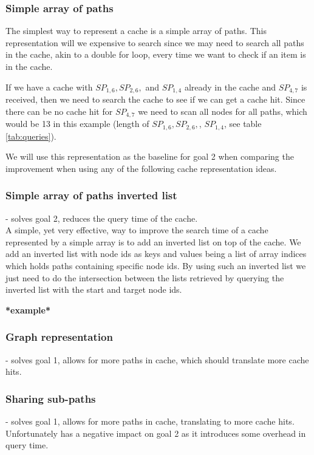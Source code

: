 \subsubsection{Simple array of paths}%
The simplest way to represent a cache is a simple array of paths. This representation will we expensive to search since we may need to search all paths in the cache, akin to a double for loop, every time we want to check if an item is in the cache.

If we have a cache with $SP_{1,6},SP_{2,6},$ and $SP_{1,4}$ already in the cache and $SP_{4,7}$ is received, then we need to search the cache to see if we can get a cache hit. Since there can be no cache hit for $SP_{4,7}$ we need to scan all nodes for all paths, which would be 13 in this example (length of $SP_{1,6},SP_{2,6},$, $SP_{1,4}$, see table \ref{tab:queries}).

We will use this representation as the baseline for goal 2 when comparing the improvement when using any of the following cache representation ideas.

\subsubsection{Simple array of paths inverted list} - solves goal 2, reduces the query time of the cache.\\
A simple, yet very effective, way to improve the search time of a cache represented by a simple array is to add an inverted list on top of the cache. We add an inverted list with node ids as keys and values being a list of array indices which holds paths containing specific node ids. By using such an inverted list we just need to do the intersection between the lists retrieved by querying the inverted list with the start and target node ids. 


\textbf{*example*}

\subsubsection{Graph representation} - solves goal 1, allows for more paths in cache, which should translate more cache hits.

\subsubsection{Sharing sub-paths} - solves goal 1, allows for more paths in cache, translating to more cache hits. Unfortunately has a negative impact on goal 2 as it introduces some overhead in query time.

